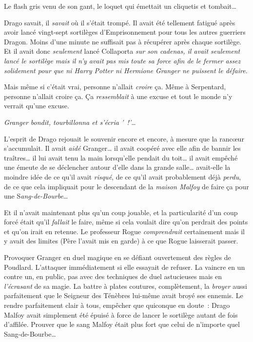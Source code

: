 Le flash gris venu de son gant, le loquet qui émettait un cliquetis et tombait…

Drago savait, il \emph{savait} où il s'était trompé. Il avait été tellement fatigué après avoir lancé vingt-sept sortilèges d'Emprisonnement pour tous les autres guerriers Dragon. Moins d'une minute ne suffisait pas à récupérer après chaque sortilège. Et il avait donc \emph{seulement} lancé Collaporta \emph{sur son cadenas, il avait seulement lancé le sortilège mais il n'y avait pas mis toute sa force afin de le fermer assez solidement pour que ni Harry Potter ni Hermione Granger ne puissent le défaire.}

Mais même si c'était vrai, personne n'allait \emph{croire} ça. Même à Serpentard, personne n'allait croire ça. Ça \emph{ressemblait} à une excuse et tout le monde n'y verrait qu'une excuse.

\emph{Granger bondit, tourbillonna et s'écria '~!'…}

L'esprit de Drago rejouait le souvenir encore et encore, à mesure que la rancœur s'accumulait. Il avait \emph{aidé} Granger… il avait coopéré avec elle afin de bannir les traîtres… il lui avait tenu la main lorsqu'elle pendait du toit… il avait empêché une émeute de se déclencher autour d'elle dans la grande salle… avait-elle la moindre idée de ce qu'il avait \emph{risqué}, de ce qu'il avait probablement déjà \emph{perdu}, de ce que cela impliquait pour le descendant de la \emph{maison Malfoy} de faire ça pour une S\emph{ang-de-Bourbe}…

Et il n'avait maintenant plus qu'un coup jouable, et la particularité d'un coup forcé était qu'il \emph{fallait} le faire, même si cela voulait dire qu'on perdrait des points et qu'on irait en retenue. Le professeur Rogue \emph{comprendrait} certainement mais il y avait des limites (Père l'avait mis en garde) à ce que Rogue laisserait passer.

Provoquer Granger en duel magique en se défiant ouvertement des règles de Poudlard. L'attaquer immédiatement si elle essayait de refuser. La vaincre en un contre un, en public, pas avec des techniques de duel astucieuses mais en \emph{l'écrasant} de sa magie. La battre à plates coutures, complètement, la \emph{broyer} aussi parfaitement que le Seigneur des Ténèbres lui-même avait broyé ses ennemis. Le rendre parfaitement clair à tous, empêcher que quiconque en doute~: Drago Malfoy avait simplement été épuisé à force de lancer le sortilège autant de fois d'affilée. Prouver que le sang Malfoy était plus fort que celui de n'importe quel Sang-de-Bourbe…

